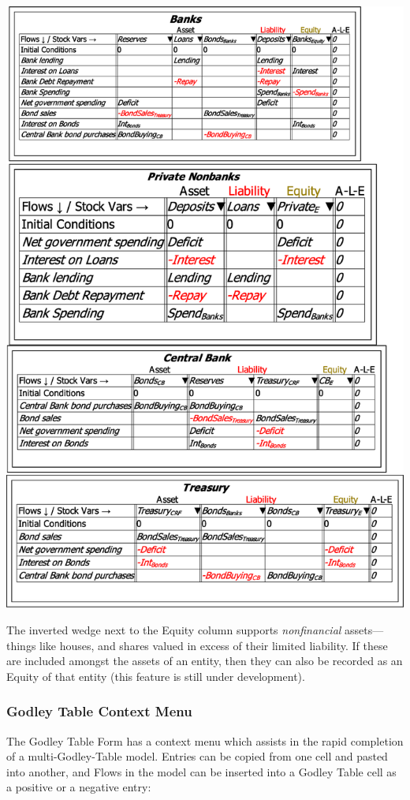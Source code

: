 \includegraphics[width=15cm]{images/GodleyTableImagesMultiTablesFinished}

The inverted wedge next to the Equity column supports \emph{nonfinancial
}assets---things like houses, and shares valued in excess of their
limited liability. If these are included amongst the assets of an
entity, then they can also be recorded as an Equity of that entity
(this feature is still under development).

\subsubsection{Godley Table Context Menu}

The Godley Table Form has a context menu which assists in the rapid
completion of a multi-Godley-Table model. Entries can be copied from
one cell and pasted into another, and Flows in the model can be inserted
into a Godley Table cell as a positive or a negative entry:

